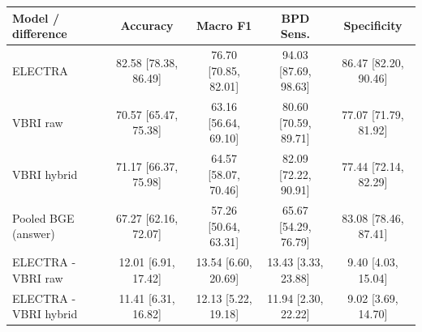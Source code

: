 \begin{tabular}{@{}lcccc@{}}
\toprule
\textbf{Model / difference} & \textbf{Accuracy} & \textbf{Macro F1} & \textbf{BPD Sens.} & \textbf{Specificity} \\
\midrule
ELECTRA & 82.58 [78.38, 86.49] & 76.70 [70.85, 82.01] & 94.03 [87.69, 98.63] & 86.47 [82.20, 90.46] \\
VBRI raw & 70.57 [65.47, 75.38] & 63.16 [56.64, 69.10] & 80.60 [70.59, 89.71] & 77.07 [71.79, 81.92] \\
VBRI hybrid & 71.17 [66.37, 75.98] & 64.57 [58.07, 70.46] & 82.09 [72.22, 90.91] & 77.44 [72.14, 82.29] \\
Pooled BGE (answer) & 67.27 [62.16, 72.07] & 57.26 [50.64, 63.31] & 65.67 [54.29, 76.79] & 83.08 [78.46, 87.41] \\
\midrule
ELECTRA - VBRI raw & 12.01 [6.91, 17.42] & 13.54 [6.60, 20.69] & 13.43 [3.33, 23.88] & 9.40 [4.03, 15.04] \\
ELECTRA - VBRI hybrid & 11.41 [6.31, 16.82] & 12.13 [5.22, 19.18] & 11.94 [2.30, 22.22] & 9.02 [3.69, 14.70] \\
\bottomrule
\end{tabular}
